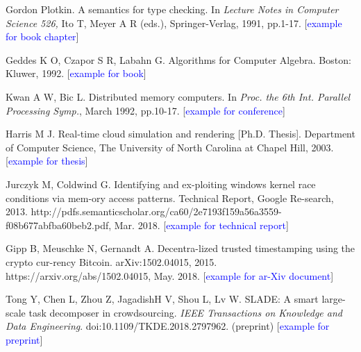 \documentclass[twoside]{article}
\begin{document}
\begin{multicols}{2}
\begin{thebibliography}{99}
 Gordon Plotkin. A semantics for type checking. In {\it Lecture Notes in Computer Science 526,} Ito T, Meyer A R (eds.), Springer-Verlag, 1991, pp.1-17. [\textcolor{blue}{example for book chapter}]

 Geddes K O, Czapor S R, Labahn G. Algorithms for Computer Algebra. Boston: Kluwer, 1992. [\textcolor{blue}{example for book}]

 Kwan A W, Bic L. Distributed memory computers. In {\it Proc. the 6th Int. Parallel Processing Symp.}, March 1992, pp.10-17. [\textcolor{blue}{example for conference}]

 Harris M J. Real-time cloud simulation and rendering [Ph.D. Thesis]. Department of Computer Science, The University of North Carolina at Chapel Hill, 2003. [\textcolor{blue}{example for thesis}]

 Jurczyk M, Coldwind G. Identifying and ex-ploiting windows kernel race conditions via mem-ory access patterns. Technical Report, Google Re-search, 2013. http://pdfs.semanticscholar.org/ca60/2e7193f159a56a3559-f08b677abfba60beb2.pdf, Mar. 2018. [\textcolor{blue}{example for technical report}]

 Gipp B, Meuschke N, Gernandt A. Decentra-lized trusted timestamping using the crypto cur-rency Bitcoin. arXiv:1502.04015, 2015. https://arxiv.org/abs/1502.04015, May. 2018. [\textcolor{blue}{example for ar-Xiv document}]

 Tong Y, Chen L, Zhou Z, JagadishH V, Shou L, Lv W. SLADE: A smart large-scale task decomposer in crowdsourcing. {\it IEEE Transactions on Knowledge and Data Engineering}. doi:10.1109/TKDE.2018.2797962. (preprint) [\textcolor{blue}{example for preprint}]

\end{thebibliography}

\label{last-page}
\end{multicols}
\label{last-page}
\end{document}
